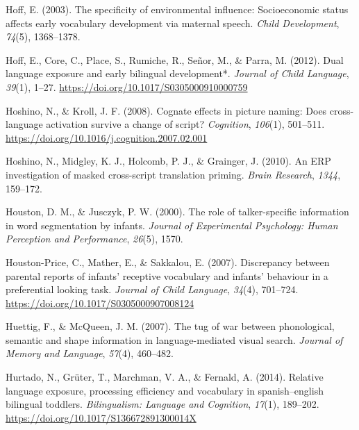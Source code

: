 \documentclass[
  12pt,
  b5paperpaper,
  twoside]{scrreprt}
\newlength{\cslhangindent}
\newlength{\cslentryspacingunit} %
\newenvironment{CSLReferences}[2] %
 {%
  \setlength{\parindent}{0pt}
  \ifodd #1
  \let\oldpar\par
  \def\par{\hangindent=\cslhangindent\oldpar}
  \fi
  \setlength{\parskip}{#2\cslentryspacingunit}
 }%
 {}
\begin{document}
\begin{CSLReferences}{1}{0}
\leavevmode{}%
Hoff, E. (2003). The specificity of environmental influence:
Socioeconomic status affects early vocabulary development via maternal
speech. \emph{Child Development}, \emph{74}(5), 1368--1378.

\leavevmode{}%
Hoff, E., Core, C., Place, S., Rumiche, R., Señor, M., \& Parra, M.
(2012). Dual language exposure and early bilingual development*.
\emph{Journal of Child Language}, \emph{39}(1), 1--27.
\url{https://doi.org/10.1017/S0305000910000759}

\leavevmode{}%
Hoshino, N., \& Kroll, J. F. (2008). Cognate effects in picture naming:
Does cross-language activation survive a change of script?
\emph{Cognition}, \emph{106}(1), 501--511.
\url{https://doi.org/10.1016/j.cognition.2007.02.001}

\leavevmode{}%
Hoshino, N., Midgley, K. J., Holcomb, P. J., \& Grainger, J. (2010). An
ERP investigation of masked cross-script translation priming.
\emph{Brain Research}, \emph{1344}, 159--172.

\leavevmode{}%
Houston, D. M., \& Jusczyk, P. W. (2000). The role of talker-specific
information in word segmentation by infants. \emph{Journal of
Experimental Psychology: Human Perception and Performance},
\emph{26}(5), 1570.

\leavevmode{}%
Houston-Price, C., Mather, E., \& Sakkalou, E. (2007). Discrepancy
between parental reports of infants' receptive vocabulary and infants'
behaviour in a preferential looking task. \emph{Journal of Child
Language}, \emph{34}(4), 701--724.
\url{https://doi.org/10.1017/S0305000907008124}

\leavevmode{}%
Huettig, F., \& McQueen, J. M. (2007). The tug of war between
phonological, semantic and shape information in language-mediated visual
search. \emph{Journal of Memory and Language}, \emph{57}(4), 460--482.

\leavevmode{}%
Hurtado, N., Grüter, T., Marchman, V. A., \& Fernald, A. (2014).
Relative language exposure, processing efficiency and vocabulary in
spanish--english bilingual toddlers. \emph{Bilingualism: Language and
Cognition}, \emph{17}(1), 189--202.
\url{https://doi.org/10.1017/S136672891300014X}


\end{CSLReferences}
\end{document}
